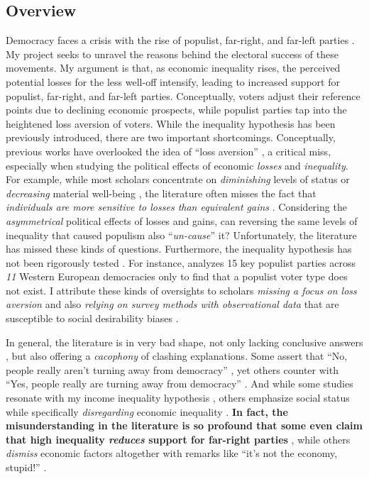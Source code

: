 \documentclass[letterpaper]{article}
\begin{document}
\vspace{-10mm}

\subsection*{Overview}

Democracy faces a crisis with the rise of populist, far-right, and far-left parties \parencite{Mudde2004,Coffe2007a}. My project seeks to unravel the reasons behind the electoral success of these movements. My argument is that, as economic inequality rises, the perceived potential losses for the less well-off intensify, leading to increased support for populist, far-right, and far-left parties. Conceptually, voters adjust their reference points due to declining economic prospects, while populist parties tap into the heightened loss aversion of voters. While the inequality hypothesis has been previously introduced, there are two important shortcomings. Conceptually, previous works have overlooked the idea of ``loss aversion'' \parencite{Kahneman1979}, a critical miss, especially when studying the political effects of economic \emph{losses} and \emph{inequality}. For example, while most scholars concentrate on \emph{diminishing} levels of status \parencite{Gidron2017a} or \emph{decreasing} material well-being \parencite{Oesch2008a}, the literature often misses the fact that \emph{individuals are more sensitive to losses than equivalent gains} \parencite[p. 171]{Levy1992a}. Considering the \emph{asymmetrical} political effects of losses and gains, can reversing the same levels of inequality that caused populism also ``\emph{un-cause}'' it? Unfortunately, the literature has missed these kinds of questions. Furthermore, the inequality hypothesis has not been rigorously tested \parencite[p. 154]{Engler2021}. For instance, \textcite{Rooduijn2018b} analyzes 15 key populist parties across \emph{11} Western European democracies only to find that a populist voter type does not exist. I attribute these kinds of oversights to scholars \emph{missing a focus on loss aversion} and also \emph{relying on survey methods with observational data} that are susceptible to social desirability biases \parencite{Kuklinski1997}. 

\vspace{2mm}In general, the literature is in very bad shape, not only lacking conclusive answers \parencite[p. 6]{Ivarsflaten2008}, but also offering a \emph{cacophony} of clashing explanations. Some assert that ``No, people really aren't turning away from democracy'' \parencite{Voeten2016}, yet others counter with ``Yes, people really are turning away from democracy'' \cite{Mounk2016}. And while some studies resonate with my income inequality hypothesis \parencite{Han2016b}, others emphasize social status while specifically \emph{disregarding} economic inequality \parencite{Gidron2017a,Oesch2008a}. {\bf In fact, the misunderstanding in the literature is so profound that some even claim that high inequality \emph{reduces} support for far-right parties} \parencite[p. 725]{Patana2020b}, while others \emph{dismiss} economic factors altogether with remarks like ``it's not the economy, stupid!'' \parencite{Mudde2007b}.  
\end{document}
